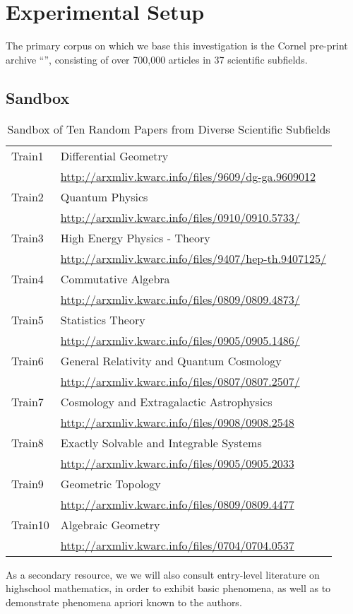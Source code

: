 \section{Experimental Setup}
The primary corpus on which we base this investigation is the Cornel pre-print archive ``\arxiv'', consisting of over 700,000 articles in 37 scientific subfields.
\subsection{\arxiv Sandbox}
\begin{table}\begin{center}
\begin{tabular}{|ll|}\hline
Train1 & Differential Geometry \\ & \url{http://arxmliv.kwarc.info/files/9609/dg-ga.9609012} \\[2mm]
Train2 & Quantum Physics \\  & \url{http://arxmliv.kwarc.info/files/0910/0910.5733/} \\[2mm]
Train3 & High Energy Physics - Theory \\  & \url{http://arxmliv.kwarc.info/files/9407/hep-th.9407125/} \\[2mm]
Train4 & Commutative Algebra \\  & \url{http://arxmliv.kwarc.info/files/0809/0809.4873/} \\[2mm]
Train5 & Statistics Theory \\  & \url{http://arxmliv.kwarc.info/files/0905/0905.1486/} \\[2mm]
Train6 & General Relativity and Quantum Cosmology \\  & \url{http://arxmliv.kwarc.info/files/0807/0807.2507/} \\[2mm]
Train7 & Cosmology and Extragalactic Astrophysics \\  & \url{http://arxmliv.kwarc.info/files/0908/0908.2548} \\[2mm]
Train8 & Exactly Solvable and Integrable Systems \\  & \url{http://arxmliv.kwarc.info/files/0905/0905.2033} \\[2mm]
Train9 & Geometric Topology \\  & \url{http://arxmliv.kwarc.info/files/0809/0809.4477} \\[2mm]
Train10 & Algebraic Geometry \\  & \url{http://arxmliv.kwarc.info/files/0704/0704.0537} \\ \hline
\end{tabular}
\caption{Sandbox of Ten Random \arxiv Papers from Diverse Scientific Subfields}
\end{center}
\end{table}

As a secondary resource, we we will also consult entry-level literature on highschool mathematics, in order to exhibit basic phenomena, as well as to demonstrate phenomena apriori known to the authors.